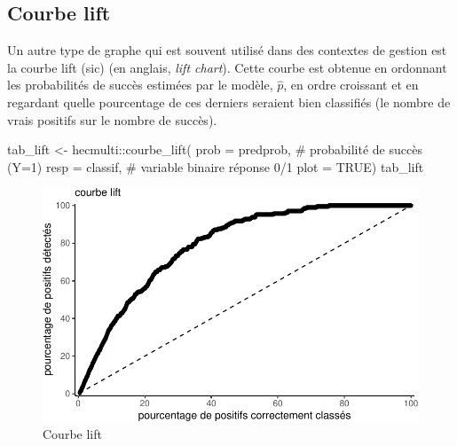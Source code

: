 \documentclass[
  11pt,
  letterpaper,
]{book}
\newenvironment{Shaded}{\begin{snugshade}}{\end{snugshade}}
\newcommand{\AttributeTok}[1]{\textcolor[rgb]{0.40,0.45,0.13}{#1}}
\newcommand{\CommentTok}[1]{\textcolor[rgb]{0.37,0.37,0.37}{#1}}
\newcommand{\ConstantTok}[1]{\textcolor[rgb]{0.56,0.35,0.01}{#1}}
\newcommand{\FunctionTok}[1]{\textcolor[rgb]{0.28,0.35,0.67}{#1}}
\newcommand{\NormalTok}[1]{\textcolor[rgb]{0.00,0.23,0.31}{#1}}
\newcommand{\OtherTok}[1]{\textcolor[rgb]{0.00,0.23,0.31}{#1}}
\newcommand{\SpecialCharTok}[1]{\textcolor[rgb]{0.37,0.37,0.37}{#1}}
\theoremstyle{definition}
\theoremstyle{remark}
\begin{document}
\hypertarget{courbe-lift}{%
\subsection{Courbe lift}\label{courbe-lift}}

Un autre type de graphe qui est souvent utilisé dans des contextes de
gestion est la courbe lift (sic) (en anglais, \emph{lift chart}). Cette
courbe est obtenue en ordonnant les probabilités de succès estimées par
le modèle, \(\widehat{p}\), en ordre croissant et en regardant quelle
pourcentage de ces derniers seraient bien classifiés (le nombre de vrais
positifs sur le nombre de succès).

\begin{Shaded}
\begin{Highlighting}[]
\NormalTok{tab\_lift }\OtherTok{\textless{}{-}}\NormalTok{ hecmulti}\SpecialCharTok{::}\FunctionTok{courbe\_lift}\NormalTok{(}
  \AttributeTok{prob =}\NormalTok{ predprob, }\CommentTok{\# probabilité de succès (Y=1)}
  \AttributeTok{resp =}\NormalTok{ classif, }\CommentTok{\# variable binaire réponse 0/1}
  \AttributeTok{plot =} \ConstantTok{TRUE}\NormalTok{)}
\NormalTok{tab\_lift}
\end{Highlighting}
\end{Shaded}

\begin{figure}[ht!]

{\centering \includegraphics{./05-reglogistique_files/figure-pdf/fig-lift-1.pdf}

}

\caption{\label{fig-lift}Courbe lift}

\end{figure}
\end{document}
